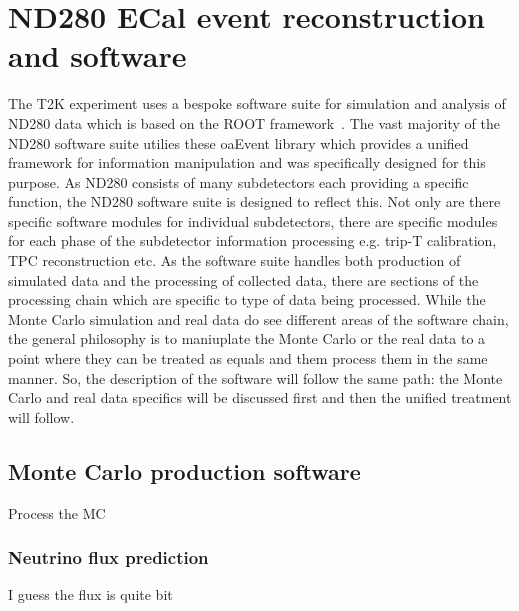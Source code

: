 


\chapter{ND280 ECal event reconstruction and software}
\label{chap:ND280Software}
The T2K experiment uses a bespoke software suite for simulation and analysis of ND280 data which is based on the ROOT framework~\cite{Brun199781}.  The vast majority of the ND280 software suite utilies these oaEvent library which provides a unified framework for information manipulation and was specifically designed for this purpose.
As ND280 consists of many subdetectors each providing a specific function, the ND280 software suite is designed to reflect this.  Not only are there specific software modules for individual subdetectors, there are specific modules for each phase of the subdetector information processing e.g. trip-T calibration, TPC reconstruction etc.  \newline
As the software suite handles both production of simulated data and the processing of collected data, there are sections of the processing chain which are specific to type of data being processed.  While the Monte Carlo simulation and real data do see different areas of the software chain, the general philosophy is to maniuplate the Monte Carlo or the real data to a point where they can be treated as equals and them process them in the same manner.  So, the description of the software will follow the same path: the Monte Carlo and real data specifics will be discussed first and then the unified treatment will follow. 
\section{Monte Carlo production software}
\label{sec:MCchain}
Process the MC

\subsection{Neutrino flux prediction}
\label{subsec:NeutrinoFluxPrediction}
I guess the flux is quite bit


